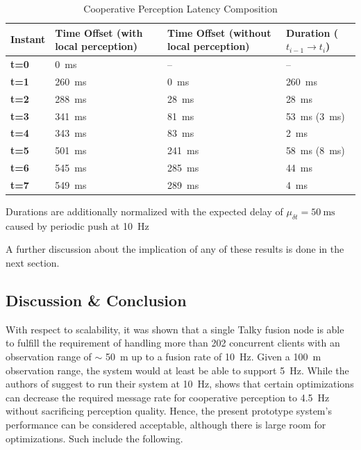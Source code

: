 \begin{table}
	\centering
	\begin{tabular}{|p{1.5cm}|p{4.1cm}|p{4.1cm}|p{4.1cm}|}
		\hline 
		\textbf{Instant} & \textbf{Time Offset} (with local perception) & \textbf{Time Offset} (without local perception) & \textbf{Duration} ($t_{i-1} \rightarrow t_i$) \\ 
		\hline 
		\textbf{t=0} & \SI{0}{\milli\second} & – & – \\ 
		\hline 
		\textbf{t=1} & \SI{260}{\milli\second} & \SI{0}{\milli\second} & \SI{260}{\milli\second} \\ 
		\hline 
		\textbf{t=2} & \SI{288}{\milli\second} & \SI{28}{\milli\second} & \SI{28}{\milli\second} \\ 
		\hline 
		\textbf{t=3} & \SI{341}{\milli\second} & \SI{81}{\milli\second} & \SI{53}{\milli\second} (\SI{3}{\milli\second}) \\ 
		\hline 
		\textbf{t=4} & \SI{343}{\milli\second} & \SI{83}{\milli\second} & \SI{2}{\milli\second} \\ 
		\hline 
		\textbf{t=5} & \SI{501}{\milli\second} & \SI{241}{\milli\second} & \SI{58}{\milli\second} (\SI{8}{\milli\second}) \\ 
		\hline 
		\textbf{t=6} & \SI{545}{\milli\second} & \SI{285}{\milli\second} & \SI{44}{\milli\second} \\ 
		\hline 
		\textbf{t=7} & \SI{549}{\milli\second} & \SI{289}{\milli\second} & \SI{4}{\milli\second} \\ 
		\hline 
	\end{tabular}
	\caption{Cooperative Perception Latency Composition}
	\label{tab:performance_evaluation:latency_composition}
	\medskip
	\small
	Durations are additionally normalized with the expected delay of $\mu_{\delta t} = \SI{50}{\milli\second}$ caused by periodic push at \SI{10}{\hertz}
\end{table}
\par
\bigskip

A further discussion about the implication of any of these results is done in the next section. 

\subsection{Discussion \& Conclusion}
\label{subsec:evaluation:performance_evaluation:discussion_conclusion}
With respect to scalability, it was shown that a single Talky fusion node is able to fulfill the requirement of handling more than 202 concurrent clients with an observation range of $\sim$ \SI{50}{\meter} up to a fusion rate of \SI{10}{\hertz}. Given a \SI{100}{\meter} observation range, the system would at least be able to support \SI{5}{\hertz}. While the authors of \cite{Calvo2017} suggest to run their system at \SI{10}{\hertz}, \cite{Thandavarayan2019} shows that certain optimizations can decrease the required message rate for cooperative perception to \SI{4.5}{\hertz} without sacrificing perception quality. Hence, the present prototype system's performance can be considered acceptable, although there is large room for optimizations. Such include the following.

